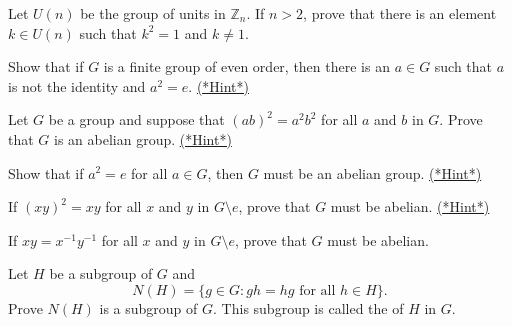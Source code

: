 \begin{exercise}{}
Let $U(n)$ be the group of units in ${\mathbb Z}_n$. If $n>2$, prove that
there is an element $k \in U(n)$ such that $k^2 = 1$ and $k \neq 1$.
\end{exercise}
 
\begin{exercise}{}\label{ex:eoc:evenInv}
Show that if $G$ is a finite group of even order, then there is an $a
\in G$ such that $a$ is not the identity and $a^2 = e$.
\hyperref[sec:Groups:Hints]{(*Hint*)} 
\end{exercise} 
 
 
 

\begin{exercise}{}\label{ex:eoc:abelian1}
Let $G$ be a group and suppose that $(ab)^2 = a^2b^2$ for all $a$ and
$b$ in $G$.  Prove that $G$ is an abelian group.
\hyperref[sec:Groups:Hints]{(*Hint*)}  
\end{exercise}

\begin{exercise}{}\label{ex:eoc:abelian2}
Show that if $a^2 = e$ for all $a \in G$, then $G$ must be an abelian group. 
\hyperref[sec:Groups:Hints]{(*Hint*)} 
\end{exercise}
 
\begin{exercise}{}\label{ex:Groups:2elt}
If $(xy)^2 = xy$ for all $x$ and $y$ in $G \setminus {e}$, prove that $G$ must be
abelian.
\hyperref[sec:Groups:Hints]{(*Hint*)}
\end{exercise}

\begin{exercise}{}\label{ex:Groups:abelian_proof}
If $xy = x^{-1} y^{-1}$ for all $x$ and $y$ in $G \setminus {e}$, prove that $G$
must be abelian.
\end{exercise} 
 
\begin{exercise}{}
Let $H$ be a subgroup of $G$ and
\[
N(H) = \{ g \in G : gh = hg \mbox{ for all $h \in H$}  \}.
\]
Prove $N(H)$ is a subgroup of $G$.  This subgroup is called the  of $H$ in $G$. 
\end{exercise}
 
